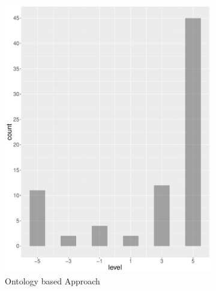\begin{figure}
    \centering
    \begin{subfigure}[b]{0.4\textwidth}
        \includegraphics[width=\textwidth]{plots/finance/hist_level_nn}
        \caption{Ontology based Approach}
        \label{fig:hist_level_finance_nn}
    \end{subfigure}
    ~
    \begin{subfigure}[b]{0.4\textwidth}

\end{subfigure}
\end{figure}
